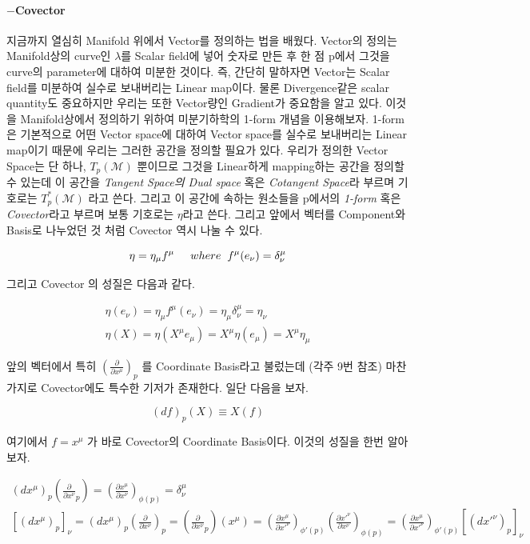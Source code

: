 \documentclass[paper=a4, fontsize=11pt]{scrartcl} %
\numberwithin{equation}{section} %
\numberwithin{figure}{section} %
\numberwithin{table}{section} %
\theoremstyle{plain}
\newcommand{\HS}{\hspace{0.5cm}}
\newcommand{\PD}[2]{\frac{\partial #1}{\partial #2}}
\newcommand{\BKS}[1]{\left( #1 \right)}
\newcommand{\Tangent}{T_p (\Manifold)}
\newcommand{\Cotangent}{T^{*}_p (\Manifold)}
\newcommand{\Manifold}{\mathcal{M}}
\newcommand{\Basis}[1][\mu]{\BKS{\PD{}{x^{#1}}}_p}
\begin{document}
\paragraph{$-$Covector} 지금까지 열심히 Manifold 위에서 Vector를 정의하는 법을 배웠다. Vector의 정의는 Manifold상의 curve인 $\lambda$를 Scalar field에 넣어 숫자로 만든 후 한 점 p에서 
그것을 curve의 parameter에 대하여 미분한 것이다. 즉, 간단히 말하자면 Vector는 Scalar field를 미분하여 실수로 보내버리는 Linear map이다. 물론 Divergence같은 scalar quantity도 중요하지만
우리는 또한 Vector량인 Gradient가 중요함을 알고 있다. 이것을 Manifold상에서 정의하기 위하여 미분기하학의 1-form 개념을 이용해보자. 1-form은 기본적으로 어떤 Vector space에 대하여
Vector space를 실수로 보내버리는 Linear map이기 때문에 우리는 그러한 공간을 정의할 필요가 있다. 우리가 정의한 Vector Space는 단 하나, $\Tangent$ 뿐이므로 그것을 Linear하게 mapping하는
공간을 정의할 수 있는데 이 공간을 \emph{Tangent Space의 Dual space} 혹은 \emph{Cotangent Space}라 부르며 기호로는 $\Cotangent$ 라고 쓴다. 
그리고 이 공간에 속하는 원소들을 p에서의 \emph{1-form} 혹은 \emph{Covector}라고 부르며 보통 기호로는 $\eta$라고 쓴다. 그리고 앞에서 벡터를 Component와 Basis로 나누었던 것 처럼 
Covector 역시 나눌 수 있다.

\begin{equation*}
 \eta = \eta_{\mu} f^{\mu} \HS where \hspace{0.2cm} f^{\mu} (e_{\nu}) = \delta^{\mu}_{\nu}
\end{equation*}

그리고 Covector 의 성질은 다음과 같다.

\begin{gather*}
 \eta(e_{\nu}) = \eta_{\mu} f^{\mu}(e_{\nu}) = \eta_{\mu} \delta^{\mu}_{\nu} = \eta_{\nu} \\
 \eta(X) = \eta(X^{\mu} e_{\mu}) = X^{\mu} \eta (e_{\mu}) = X^{\mu} \eta_{\mu}
\end{gather*}

앞의 벡터에서 특히 $\Basis$ 를 Coordinate Basis라고 불렀는데 (각주 9번 참조) 마찬가지로 Covector에도 특수한 기저가 존재한다. 일단 다음을 보자.

\begin{equation}
\label{eq:CC}
 (df)_p (X) \equiv X(f)
\end{equation}

여기에서 $f=x^{\mu}$ 가 바로 Covector의 Coordinate Basis이다. 이것의 성질을 한번 알아보자.

\begin{gather}
\label{eq:dual}
 (dx^{\mu})_p \BKS{\PD{}{x^{\nu}}_p} = \BKS{\PD{x^{\mu}}{x^{\nu}}}_{\phi(p)} = \delta^{\mu}_{\nu} \\
 \left[ (dx^{\mu})_p \right] _{\nu} = (dx^{\mu})_p \BKS{\PD{}{x^{\nu}}}_p = \BKS{ \PD{}{x^{\nu}}_p } \BKS{x^{\mu}} = \BKS{\PD{x^{\mu}}{x'^{\nu}}}_{\phi'(p)} \BKS{\PD{x'^{\nu}}{x^{\nu}}}_{\phi(p)}
 = \BKS{\PD{x^{\mu}}{x'^{\nu}}}_{\phi'(p)} \left[ (dx'^{\nu})_p \right]_{\nu}
 \label{eq:covector}
\end{gather}
\end{document}

